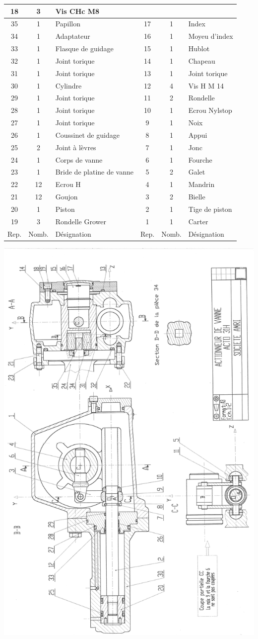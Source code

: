 \documentclass[10pt,fleqn]{article} %
\begin{document}
\begin{center}
\begin{tabular}{|c|c|p{.3\linewidth}||c|c|p{.3\linewidth}|}
\hline
18	&3	&Vis CHc M8 &&&\\ \hline
35	&1	&Papillon	&17	&1&	Index\\ \hline
34	&1	&Adaptateur	&16	&1&	Moyeu d'index\\ \hline
33	&1	&Flasque de guidage	&15&	1&	Hublot\\ \hline
32	&1	&Joint torique	&14&	1&	Chapeau\\ \hline
31	&1	&Joint torique	&13&	1&	Joint torique\\ \hline
30	&1	&Cylindre	&12&	4&	Vis H M 14\\ \hline
29	&1	&Joint torique	&11&	2&	Rondelle\\ \hline
28	&1	&Joint torique	&10&	1&	Ecrou Nylstop\\ \hline
27	&1	&Joint torique	&9&	1&	Noix\\ \hline
26	&1	&Coussinet de guidage	&8&	1&	Appui\\ \hline
25	&2	&Joint à lèvres 	&7&	1&	Jonc\\ \hline
24	&1	&Corps de vanne	&6&	1&	Fourche\\ \hline
23	&1	&Bride de platine de vanne	&5&	2&	Galet\\ \hline
22	&12	&Ecrou H	&4&	1&	Mandrin\\ \hline
21	&12	&Goujon	&3&	2&	Bielle\\ \hline
20	&1	&Piston	&2&	1&	Tige de piston\\ \hline
19	&3	&Rondelle Grower	&1&	1&	Carter\\ \hline \hline
Rep.& 	Nomb.	&Désignation	&Rep.	&Nomb.	&Désignation\\ \hline
\end{tabular}
\end{center}


\begin{center}
\includegraphics[width=.8\linewidth]{images/fig_03}
\end{center}
\fi
\end{document}
